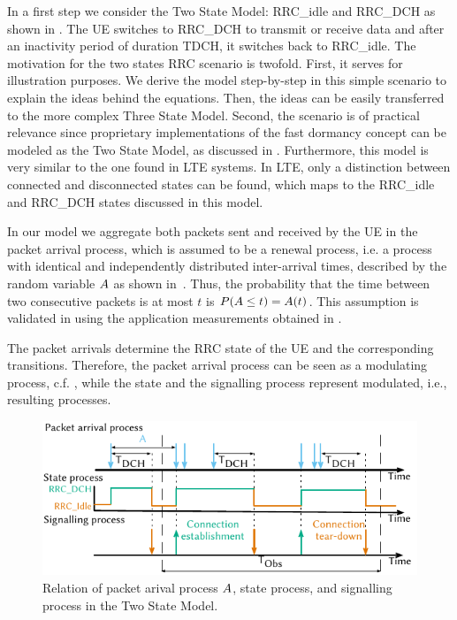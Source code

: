In a first step we consider the Two State Model: \gls{RRC_idle} and \gls{RRC_DCH} as shown in .
The \gls{UE} switches to \gls{RRC_DCH} to transmit or receive data and after an inactivity period of duration \gls{TDCH}, it switches back to \gls{RRC_idle}. 
The motivation for the two states \gls{RRC} scenario is twofold.
First, it serves for illustration purposes.
We derive the model step-by-step in this simple scenario to explain the ideas behind the equations.
Then, the ideas can be easily transferred to the more complex Three State Model.
Second, the scenario is of practical relevance since proprietary implementations of the fast dormancy concept can be modeled as the Two State Model, as discussed in .
Furthermore, this model is very similar to the one found in \gls{LTE} systems.
In \gls{LTE}, only a distinction between connected and disconnected states can be found, which maps to the \gls{RRC_idle} and \gls{RRC_DCH} states discussed in this model.

In our model we aggregate both packets sent and received by the \gls{UE} in the packet arrival process, which is assumed to be a renewal process, i.e. a process  with identical and independently distributed inter-arrival times, described by the random variable \(A\) as shown in~.
Thus, the probability that the time between two consecutive packets is at most \(t\) is \(P(A \leq t) = A(t)\).
This assumption is validated in  using the application measurements obtained in .

The packet arrivals determine the \gls{RRC} state of the \gls{UE} and the corresponding transitions. Therefore, the packet arrival process can be seen as a modulating process, c.f. \cite{TranGia1983,TranGia1988}, while the state and the signalling process represent modulated, i.e., resulting processes.

\begin{figure}
  \centering
  \includegraphics{network/performance_model/analytical_model/figures/arrival_process}
  \caption{Relation of packet arival process \(A\), state process, and signalling process in the Two State Model.}
  \label{fig:network:performance_model:system_description:arrival_process}
\end{figure}

